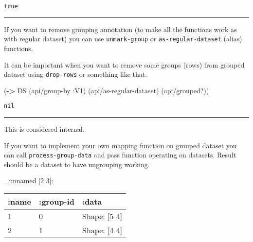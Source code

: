 \documentclass[]{article}
\newenvironment{Shaded}{\begin{snugshade}}{\end{snugshade}}
\newcommand{\KeywordTok}[1]{\textcolor[rgb]{0.13,0.29,0.53}{\textbf{#1}}}
\newcommand{\StringTok}[1]{\textcolor[rgb]{0.31,0.60,0.02}{#1}}
\newcommand{\VariableTok}[1]{\textcolor[rgb]{0.00,0.00,0.00}{#1}}
\newcommand{\AttributeTok}[1]{\textcolor[rgb]{0.77,0.63,0.00}{#1}}
\newcommand{\NormalTok}[1]{#1}
\begin{document}
\begin{verbatim}
true
\end{verbatim}

\begin{center}\rule{0.5\linewidth}{0.5pt}\end{center}

If you want to remove grouping annotation (to make all the functions
work as with regular dataset) you can use \texttt{unmark-group} or
\texttt{as-regular-dataset} (alias) functions.

It can be important when you want to remove some groups (rows) from
grouped dataset using \texttt{drop-rows} or something like that.

\begin{Shaded}
\begin{Highlighting}[]
\NormalTok{(}\KeywordTok{->}\NormalTok{ DS}
\NormalTok{    (api/group-by }\AttributeTok{:V1}\NormalTok{)}
\NormalTok{    (api/as-regular-dataset)}
\NormalTok{    (api/grouped?))}
\end{Highlighting}
\end{Shaded}

\begin{verbatim}
nil
\end{verbatim}

\begin{center}\rule{0.5\linewidth}{0.5pt}\end{center}

This is considered internal.

If you want to implement your own mapping function on grouped dataset
you can call \texttt{process-group-data} and pass function operating on
datasets. Result should be a dataset to have ungrouping working.

\begin{Shaded}
\end{Shaded}

\_unnamed {[}2 3{]}:

\begin{longtable}[]{@{}lll@{}}
\toprule
:name & :group-id & :data\tabularnewline
\midrule
\endhead
1 & 0 & Shape: {[}5 4{]}\tabularnewline
2 & 1 & Shape: {[}4 4{]}\tabularnewline
\bottomrule
\end{longtable}
\end{document}

